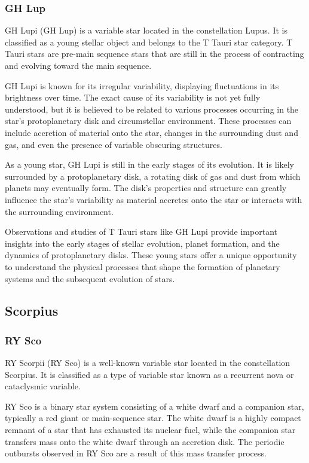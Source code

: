 \subsubsection*{ GH Lup }
GH Lupi (GH Lup) is a variable star located in the constellation Lupus. It is classified as a young stellar object and belongs to the T Tauri star category. T Tauri stars are pre-main sequence stars that are still in the process of contracting and evolving toward the main sequence.

GH Lupi is known for its irregular variability, displaying fluctuations in its brightness over time. The exact cause of its variability is not yet fully understood, but it is believed to be related to various processes occurring in the star's protoplanetary disk and circumstellar environment. These processes can include accretion of material onto the star, changes in the surrounding dust and gas, and even the presence of variable obscuring structures.

As a young star, GH Lupi is still in the early stages of its evolution. It is likely surrounded by a protoplanetary disk, a rotating disk of gas and dust from which planets may eventually form. The disk's properties and structure can greatly influence the star's variability as material accretes onto the star or interacts with the surrounding environment.

Observations and studies of T Tauri stars like GH Lupi provide important insights into the early stages of stellar evolution, planet formation, and the dynamics of protoplanetary disks. These young stars offer a unique opportunity to understand the physical processes that shape the formation of planetary systems and the subsequent evolution of stars.



\subsection{Scorpius}

\subsubsection*{ RY Sco }
RY Scorpii (RY Sco) is a well-known variable star located in the constellation Scorpius. It is classified as a type of variable star known as a recurrent nova or cataclysmic variable.

RY Sco is a binary star system consisting of a white dwarf and a companion star, typically a red giant or main-sequence star. The white dwarf is a highly compact remnant of a star that has exhausted its nuclear fuel, while the companion star transfers mass onto the white dwarf through an accretion disk. The periodic outbursts observed in RY Sco are a result of this mass transfer process.

